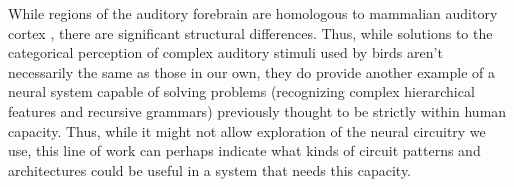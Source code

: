 While regions of the auditory forebrain are homologous to mammalian auditory cortex \cite{wang2010laminar}, there are significant structural differences. Thus, while solutions to the categorical perception of complex auditory stimuli used by birds aren't necessarily the same as those in our own, they do provide another example of a neural system capable of solving problems (recognizing complex hierarchical features and recursive grammars) previously thought to be strictly within human capacity. Thus, while it might not allow exploration of the neural circuitry we use, this line of work can perhaps indicate what kinds of circuit patterns and architectures could be useful in a system that needs this capacity.